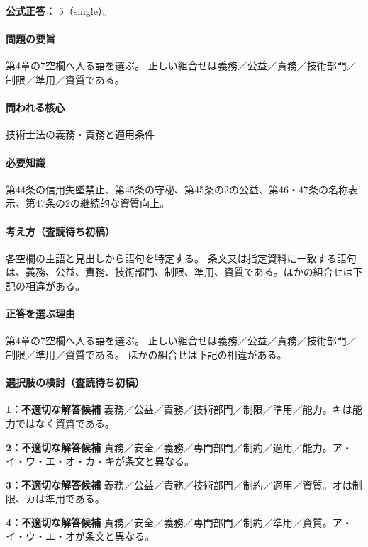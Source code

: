 \textbf{公式正答：} 5（single）。

\paragraph{問題の要旨} 第4章の7空欄へ入る語を選ぶ。 正しい組合せは義務／公益／責務／技術部門／制限／準用／資質である。

\paragraph{問われる核心} 技術士法の義務・責務と適用条件

\paragraph{必要知識} 第44条の信用失墜禁止、第45条の守秘、第45条の2の公益、第46・47条の名称表示、第47条の2の継続的な資質向上。

\paragraph{考え方（査読待ち初稿）} 各空欄の主語と見出しから語句を特定する。 条文又は指定資料に一致する語句は、義務、公益、責務、技術部門、制限、準用、資質である。ほかの組合せは下記の相違がある。

\paragraph{正答を選ぶ理由} 第4章の7空欄へ入る語を選ぶ。 正しい組合せは義務／公益／責務／技術部門／制限／準用／資質である。 ほかの組合せは下記の相違がある。

\paragraph{選択肢の検討（査読待ち初稿）}

\noindent\textbf{1：不適切な解答候補} 義務／公益／責務／技術部門／制限／準用／能力。キは能力ではなく資質である。\par

\noindent\textbf{2：不適切な解答候補} 責務／安全／義務／専門部門／制約／適用／能力。ア・イ・ウ・エ・オ・カ・キが条文と異なる。\par

\noindent\textbf{3：不適切な解答候補} 義務／公益／責務／技術部門／制約／適用／資質。オは制限、カは準用である。\par

\noindent\textbf{4：不適切な解答候補} 責務／安全／義務／専門部門／制約／準用／資質。ア・イ・ウ・エ・オが条文と異なる。\par

